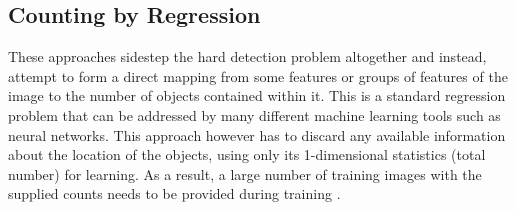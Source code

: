 \subsection{Counting by Regression}
These approaches sidestep the hard detection problem altogether and instead, attempt to form a direct mapping from some features or groups of features of the image to the number of objects contained within it. This is a standard regression problem that can be addressed by many different machine learning tools such as neural networks. This approach however has to discard any available information about the location of the objects, using only its 1-dimensional statistics (total number) for learning. As a result, a large number of training images with the supplied counts needs to be provided during training \cite{REF18}.


\bigskip

\goodbreak
